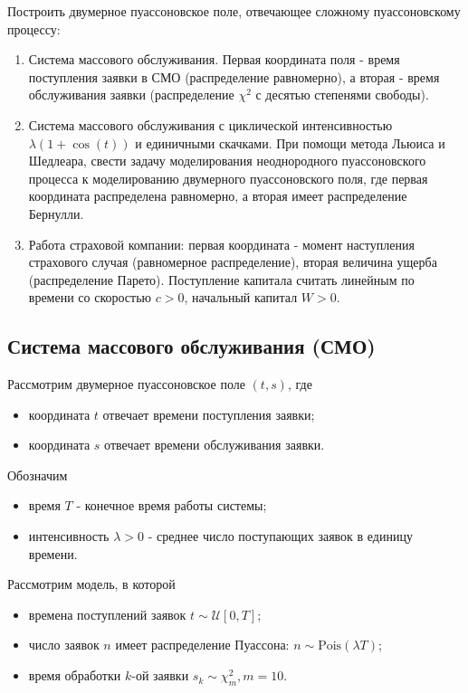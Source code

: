 \documentclass[11pt]{report}
\begin{document}
Построить двумерное пуассоновское поле, отвечающее сложному пуассоновскому процессу:
\begin{enumerate}
\item Система массового обслуживания. Первая координата поля - время поступления заявки в СМО (распределение равномерно), а вторая - время обслуживания заявки (распределение $\chi^2$ с десятью степенями свободы).
\item Система массового обслуживания с циклической интенсивностью $\lambda(1+\cos(t))$ и единичными скачками. При помощи метода Льюиса и Шедлеара, свести задачу моделирования неоднородного пуассоновского процесса к моделированию двумерного пуассоновского поля, где первая координата распределена равномерно, а вторая имеет распределение Бернулли.
\item Работа страховой компании: первая координата - момент наступления страхового случая (равномерное распределение), вторая величина ущерба (распределение Парето). Поступление капитала считать линейным по времени со скоростью $c>0$, начальный капитал $W>0$.
\end{enumerate}

\subsection{Система массового обслуживания (СМО)}

Рассмотрим двумерное пуассоновское поле $(t,s)$, где
\begin{itemize}
\item координата $t$ отвечает времени поступления заявки;
\item координата $s$ отвечает времени обслуживания заявки.
\end{itemize}

Обозначим
\begin{itemize}
\item время $T$ - конечное время работы системы;
\item интенсивность $\lambda > 0$ - среднее число поступающих заявок в единицу времени.
\end{itemize}

Рассмотрим модель, в которой
\begin{itemize}
\item времена поступлений заявок $t \sim \mathcal{U}[0,T]$;
\item число заявок $n$ имеет распределение Пуассона: $n\sim\mathrm{Pois}(\lambda T)$;
\item время обработки $k$-ой заявки $s_k\sim\chi^2_{m},m=10$.
\end{itemize}
\end{document}
